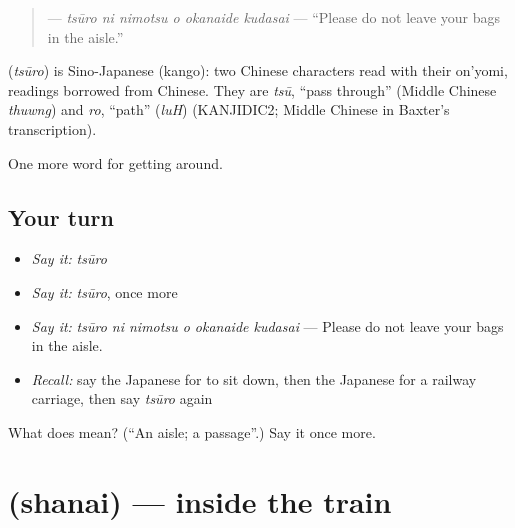 \begin{quote}
\textbf{   } — \emph{tsūro ni nimotsu o okanaide kudasai} — \textquotedblleft{}Please do not leave your bags in the aisle.\textquotedblright{}
\end{quote}

\begin{cousinweb}
\textbf{} (\emph{tsūro}) is Sino-Japanese (kango): two Chinese characters read with their on'yomi, readings borrowed from Chinese. They are \emph{tsū}, \textquotedblleft{}pass through\textquotedblright{} (Middle Chinese \emph{thuwng}) and \emph{ro}, \textquotedblleft{}path\textquotedblright{} (\emph{luH}) (KANJIDIC2; Middle Chinese in Baxter's transcription).
\end{cousinweb}

\begin{grammarlens}[title={What you've built}]
One more word for getting around.
\end{grammarlens}

\subsection*{Your turn}
\begin{itemize}
\raggedright
  \item \emph{Say it:} \emph{tsūro}
  \item \emph{Say it:} \emph{tsūro}, once more
  \item \emph{Say it:} \emph{tsūro ni nimotsu o okanaide kudasai} — Please do not leave your bags in the aisle.
  \item \emph{Recall:} say the Japanese for to sit down, then the Japanese for a railway carriage, then say \emph{tsūro} again
\end{itemize}

\begin{tcolorbox}[breakable,colback=teal!4,colframe=teal!35!black,title={Before you move on}]
What does  mean? (\textquotedblleft{}An aisle; a passage\textquotedblright{}.) Say it once more.
\end{tcolorbox}
\section[\texorpdfstring{\ja{しゃない} (shanai)}{しゃない (shanai)}]{ (shanai) — inside the train}

\label{lesson:JA-C379-shanai}



